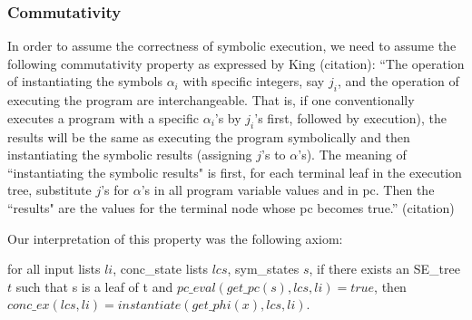




 



\subsubsection{Commutativity}
In order to assume the correctness of symbolic execution, we need to assume the following commutativity property as expressed by King (citation):
``The operation of instantiating the symbols
{$\alpha_i$} with specific integers, say {$j_i$}, and the operation of
executing the program are interchangeable. That is, if
one conventionally executes a program with a specific
$\alpha_i$'s by
$j_i$'s first, followed by execution), the results will be the
same as executing the program symbolically and then
instantiating the symbolic results (assigning $j$'s to $\alpha$'s).
The meaning of ``instantiating the symbolic results" is
first, for each terminal leaf in the execution tree, substitute
$j$'s for $\alpha$'s in all program variable values and in
pc. Then the ``results" are the values for the terminal 
node whose pc becomes true.'' (citation)


Our interpretation of this property was the following axiom:
\begin{axiom}
for all input lists $li$, conc\_state lists $lcs$, sym\_states $s$,
if there exists an SE\_tree $t$ such that
s is a leaf of t and
$pc\_eval (get\_pc(s), lcs, li) = true$,
then
$conc\_ex(lcs, li) = instantiate (get\_phi (x), lcs, li)$.
\end{axiom}

